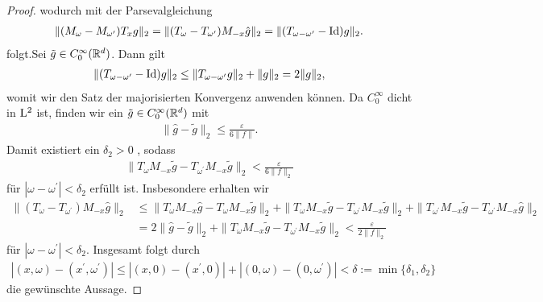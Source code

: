 \begin{proof}
	wodurch mit der Parsevalgleichung 
	\begin{align*}
	\| (M_\omega - M_{\omega^\prime}) T_x g \|_2
	=
	\| (T_\omega - T_{\omega^\prime}) M_{-x} \hat{g} \|_2
	=
	\| (T_{\omega - \omega^\prime} - \operatorname{Id}) g \|_2.
	\end{align*}
    folgt.Sei $ \tilde{g}  \in C_0^\infty(\mathbb{R}^d)$.
	Dann gilt
	\begin{align*}
	\| (T_{\omega - \omega^\prime} - \operatorname{Id}) g \|_2 \leq 
	\| T_{\omega - \omega^\prime} g \|_2 + \| g \|_2 
	= 2 \| g \|_2,
	\end{align*}
	womit wir den Satz der majorisierten Konvergenz anwenden können.
	Da $ C_0^\infty $ dicht in $ \mathrm{L}^2 $ ist, finden wir ein $ \tilde{g}  \in C_0^\infty(\mathbb{R}^d)$ mit
	\begin{align*}
	\| \hat{g} - \tilde{g} \|_2 \leq \frac{\varepsilon}{6 \| f\|}.
	\end{align*}
	Damit existiert ein $ \delta_2 > 0 $ , sodass
	\begin{align*}
	\| T_\omega M_{-x} \tilde{g} - T_{\omega^\prime} M_{-x} \tilde{g} \|_2
	< 
	\frac{\varepsilon}{6 \| f \|_2}
	\end{align*} 
	für $ | \omega - \omega^\prime| < \delta_2 $ erfüllt ist.
	Insbesondere erhalten wir
	\begin{align*}
	\| (T_\omega - T_{\omega^\prime}) M_{-x} \hat{g} \|_2
	&\leq 
	\| T_\omega M_{-x} \hat{g} - T_\omega M_{-x} \tilde{g} \|_2
	+
	\| T_\omega M_{-x} \tilde{g} - T_{\omega^\prime} M_{-x} \tilde{g} \|_2
	+
	\| T_{\omega^\prime} M_{-x} \tilde{g} - T_{\omega^\prime} M_{-x} \hat{g} \|_2\\
	&= 2 \| \hat{g} - \tilde{g} \|_2
	+ 
	\| T_\omega M_{-x} \tilde{g} - T_{\omega^\prime} M_{-x} \tilde{g} \|_2
	< 
	\frac{\varepsilon}{2 \| f\|_2}
 	\end{align*}
	für $ | \omega - \omega^\prime| < \delta_2 $.
	Insgesamt folgt durch
	\begin{align*}
	| (x,\omega) - (x^\prime, \omega^\prime) | \leq
	| (x,0) -(x^\prime,0) | + | (0,\omega) - (0, \omega^\prime) | < \delta :=\min\lbrace \delta_1 , \delta_2 \rbrace
	\end{align*}
	die gewünschte Aussage.
\end{proof}

